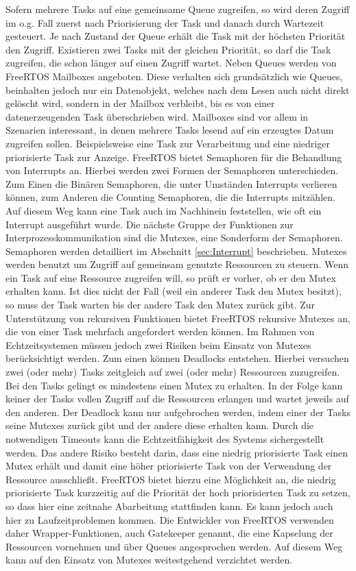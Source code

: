 Sofern mehrere Tasks auf eine gemeinsame Queue zugreifen, so wird deren Zugriff im o.g. Fall zuerst nach Priorisierung der Task und danach durch Wartezeit gesteuert. Je nach Zustand der Queue erhält die Task mit der höchsten Priorität den Zugriff. Existieren zwei Tasks mit der gleichen Priorität, so darf die Task zugreifen, die schon länger auf einen Zugriff wartet.
Neben Queues werden von FreeRTOS Mailboxes angeboten. Diese verhalten sich grund\-sätz\-lich wie Queues, beinhalten jedoch nur ein Datenobjekt, welches nach dem Lesen auch nicht direkt gelöscht wird, sondern in der Mailbox verbleibt, bis es von einer datenerzeugenden Task überschrieben wird. Mailboxes sind vor allem in Szenarien interessant, in denen mehrere Tasks lesend auf ein erzeugtes Datum zugreifen sollen. Beispielsweise eine Task zur Verarbeitung und eine niedriger priorisierte Task zur Anzeige.
FreeRTOS bietet Semaphoren für die Behandlung von Interrupts an. Hierbei werden zwei Formen der Semaphoren unterschieden. Zum Einen die Binären Semaphoren, die unter Umständen Interrupts verlieren können, zum Anderen die Counting Semaphoren, die die Interrupts mitzählen. Auf diesem Weg kann eine Task auch im Nachhinein feststellen, wie oft ein Interrupt ausgeführt wurde.
Die nächste Gruppe der Funktionen zur Interprozesskommunikation sind die Mutexes, eine Sonderform der Semaphoren. Semaphoren werden detailliert im Abschnitt \ref{sec:Interrupt} beschrieben. Mutexes werden benutzt um Zugriff auf gemeinsam genutzte Ressourcen zu steuern. Wenn ein Task auf eine Ressource zugreifen will, so prüft er vorher, ob er den Mutex erhalten kann. Ist dies nicht der Fall (weil ein anderer Task den Mutex besitzt), so muss der Task warten bis der andere Task den Mutex zurück gibt. Zur Unterstützung von rekursiven Funktionen bietet FreeRTOS rekursive Mutexes an, die von einer Task mehrfach angefordert werden können. Im Rahmen von Echtzeitsystemen müssen jedoch zwei Risiken beim Einsatz von Mutexes berücksichtigt werden. Zum einen können Deadlocks entstehen. Hierbei versuchen zwei (oder mehr) Tasks zeitgleich auf zwei (oder mehr) Ressourcen zuzugreifen. Bei den Tasks gelingt es mindestens einen Mutex zu erhalten. In der Folge kann keiner der Tasks vollen Zugriff auf die Ressourcen erlangen und wartet jeweils auf den anderen. Der Deadlock kann nur aufgebrochen werden, indem einer der Tasks seine Mutexes zurück gibt und der andere diese erhalten kann. Durch die notwendigen Timeouts kann die Echt\-zeit\-fähig\-keit des Systems sichergestellt werden. Das andere Risiko besteht darin, dass eine niedrig priorisierte Task einen Mutex erhält und damit eine höher priorisierte Task von der Verwendung der Ressource ausschließt. FreeRTOS bietet hierzu eine Möglichkeit an, die niedrig priorisierte Task kurzzeitig auf die Priorität der hoch priorisierten Task zu setzen, so dass hier eine zeitnahe Abarbeitung stattfinden kann. Es kann jedoch auch hier zu Laufzeitproblemen kommen. Die Entwickler von FreeRTOS verwenden daher Wrapper-Funktionen, auch Gatekeeper genannt, die eine Kapselung der Ressourcen vornehmen und über Queues angesprochen werden. Auf diesem Weg kann auf den Einsatz von Mutexes weitestgehend verzichtet werden.
